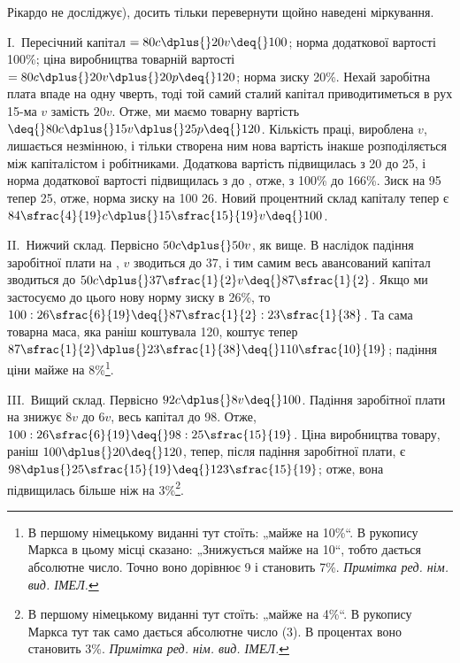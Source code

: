 \parcont{}  %
Рікардо не досліджує), досить тільки перевернути щойно наведені
міркування.

I.~Пересічний капітал $= 80 c \dplus{} 20 v \deq{} 100$; норма додаткової
вартості \deq{} 100\%; ціна виробництва \deq{} товарній вартості $= 80 c \dplus{}
20 v \dplus{} 20 p \deq{} 120$; норма зиску \deq{} 20\%. Нехай заробітна плата
впаде на одну чверть, тоді той самий сталий капітал приводитиметься
в рух 15-ма $v$ замість $20 v$. Отже, ми маємо товарну
вартість $ \deq{} 80 c \dplus{} 15 v \dplus{} 25 p \deq{} 120$. Кількість праці, вироблена $v$,
лишається  незмінною, і тільки створена ним нова вартість інакше
розподіляється між капіталістом і робітниками. Додаткова вартість
підвищилась з 20 до 25, і норма додаткової вартості
підвищилась з  до , отже, з 100\% до 166\%.
Зиск на 95 тепер \deq{} 25, отже, норма зиску на 100 \deq{} 26. Новий
процентний склад капіталу тепер є $84\sfrac{4}{19}c \dplus{} 15\sfrac{15}{19}v \deq{} 100$.

II.~Нижчий склад. Первісно $50 c \dplus{} 50 v$, як вище. В наслідок
падіння заробітної плати на , $v$ зводиться до 37, і тим самим
весь авансований капітал зводиться до $50 c \dplus{} 37\sfrac{1}{2}v \deq{} 87\sfrac{1}{2}$. Якщо
ми застосуємо до цього нову норму зиску в 26\%, то
$100 : 26\sfrac{6}{19} \deq{} 87\sfrac{1}{2} : 23\sfrac{1}{38}$. Та сама товарна маса,
яка раніш коштувала 120, коштує
тепер $87\sfrac{1}{2} \dplus{} 23\sfrac{1}{38} \deq{} 110\sfrac{10}{19}$; падіння ціни
майже на 8\%\footnote*{
В першому німецькому виданні тут стоїть: „майже на 10\%“. В рукопису
Маркса в цьому місці сказано: „Знижується майже на 10“, тобто дається абсолютне
число. Точно воно дорівнює 9 і становить 7\%. \emph{Примітка ред. нім. вид. ІМЕЛ.}
}.

III.~Вищий склад. Первісно $92 c \dplus{} 8 v \deq{} 100$. Падіння заробітної
плати на  знижує $8 v$ до $6 v$, весь капітал до 98. Отже,
$100 : 26\sfrac{6}{19} \deq{} 98 : 25\sfrac{15}{19}$. Ціна виробництва товару,
раніш $100 \dplus{} 20 \deq{} 120$, тепер, після падіння заробітної плати, є
$98 \dplus{} 25\sfrac{15}{19} \deq{} 123\sfrac{15}{19}$;
отже, вона підвищилась більше ніж на 3\%\footnote*{
В першому німецькому виданні тут стоїть: „майже на 4\%“. В рукопису
Маркса тут так само дається абсолютне число (3). В процентах воно
становить 3\%. \emph{Примітка ред. нім. вид. ІМЕЛ.}
}.

